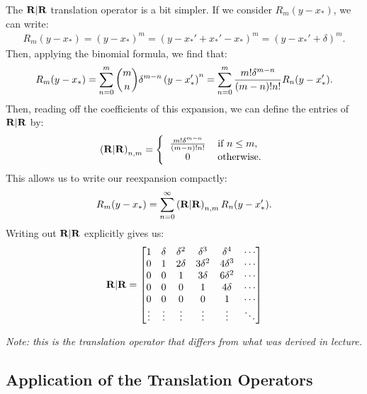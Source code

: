 The $\bold{R}|\bold{R}$
translation operator is a bit simpler. If we consider $R_m(y - x_*)$,
we can write:
\begin{align*}
  R_m(y - x_*) = (y - x_*)^m = (y - x_*' + x_*' - x_*)^m = (y - x_*' + \delta)^m.
\end{align*}
Then, applying the binomial formula, we find that:
\begin{align*}
  R_m(y - x_*) = \sum_{n=0}^m {m \choose n} \delta^{m - n} \left(y - x_*'\right)^n = \sum_{n=0}^m {m! \delta^{m - n} \over (m - n)! n!} R_n(y - x_*').
\end{align*}
Then, reading off the coefficients of this expansion, we can define
the entries of $\bold{R}|\bold{R}$ by:
\begin{align*}
  \parens{\RRmat}_{n,m} = \left\{ \begin{tabular}{cl}
                                    ${m! \delta^{m - n} \over (m - n)! n!}$ & if $n \leq m$, \\
                                    $0$ & otherwise.
                                  \end{tabular} \right.
\end{align*}
This allows us to write our reexpansion compactly:
\begin{align*}
  R_m(y - x_*) = \sum_{n=0}^\infty \left(\bold{R}|\bold{R}\right)_{n,m} R_n(y - x_*').
\end{align*}
Writing out $\bold{R}|\bold{R}$ explicitly gives us:
\begin{align*}
  \bold{R}|\bold{R} = \begin{bmatrix}
    1 & \delta & \delta^2 & \delta^3 & \delta^4 & \cdots \\
    0 & 1 & 2\delta & 3 \delta^2 & 4\delta^3 & \cdots \\
    0 & 0 & 1 & 3 \delta & 6\delta^2 & \cdots \\
    0 & 0 & 0 & 1 & 4 \delta & \cdots \\
    0 & 0 & 0 & 0 & 1 & \cdots \\
    \vdots & \vdots & \vdots & \vdots & \vdots & \ddots
  \end{bmatrix}
\end{align*} 

\emph{Note: this is the translation operator that differs from what
  was derived in lecture.}

\subsection{Application of the Translation Operators}

